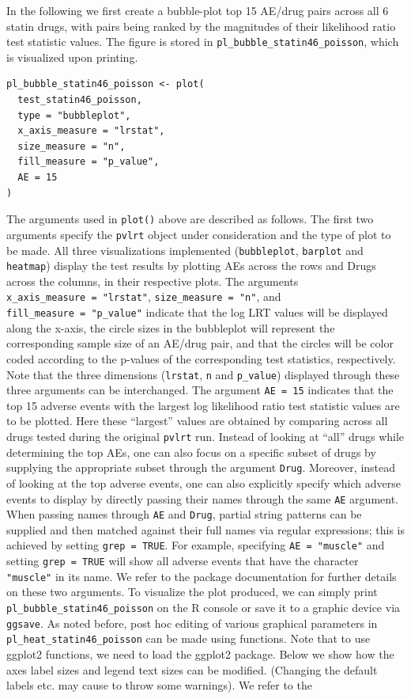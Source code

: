 In the following we first create a bubble-plot top 15 AE/drug pairs across all 6 statin drugs, with pairs being ranked by the magnitudes of their likelihood ratio test statistic values. The figure is stored in \texttt{pl\_bubble\_statin46\_poisson}, which is visualized upon printing.

\begin{verbatim}
pl_bubble_statin46_poisson <- plot(
  test_statin46_poisson,
  type = "bubbleplot",
  x_axis_measure = "lrstat",
  size_measure = "n",
  fill_measure = "p_value",
  AE = 15
)
\end{verbatim}

The arguments used in \texttt{plot()} above are described as follows. The first two arguments specify the \texttt{pvlrt} object under consideration and the type of plot to be made. All three visualizations implemented (\texttt{bubbleplot}, \texttt{barplot} and \texttt{heatmap}) display the test results by plotting AEs across the rows and Drugs across the columns, in their respective plots. The arguments \texttt{x\_axis\_measure\ =\ "lrstat"}, \texttt{size\_measure\ =\ "n"}, and \texttt{fill\_measure\ =\ "p\_value"} indicate that the log LRT values will be displayed along the x-axis, the circle sizes in the bubbleplot will represent the corresponding sample size of an AE/drug pair, and that the circles will be color coded according to the p-values of the corresponding test statistics, respectively. Note that the three dimensions (\texttt{lrstat}, \texttt{n} and \texttt{p\_value}) displayed through these three arguments can be interchanged. The argument \texttt{AE\ =\ 15} indicates that the top 15 adverse events with the largest log likelihood ratio test statistic values are to be plotted. Here these ``largest'' values are obtained by comparing across all drugs tested during the original \texttt{pvlrt} run. Instead of looking at ``all'' drugs while determining the top AEs, one can also focus on a specific subset of drugs by supplying the appropriate subset through the argument \texttt{Drug}. Moreover, instead of looking at the top adverse events, one can also explicitly specify which adverse events to display by directly passing their names through the same \texttt{AE} argument. When passing names through \texttt{AE} and \texttt{Drug}, partial string patterns can be supplied and then matched against their full names via regular expressions; this is achieved by setting \texttt{grep\ =\ TRUE}. For example, specifying \texttt{AE\ =\ "muscle"} and setting \texttt{grep\ =\ TRUE} will show all adverse events that have the character \texttt{"muscle"} in its name. We refer to the package documentation for further details on these two arguments. To visualize the plot produced, we can simply print \texttt{pl\_bubble\_statin46\_poisson} on the R console or save it to a graphic device via \texttt{ggsave}. As noted before, post hoc editing of various graphical parameters in \texttt{pl\_heat\_statin46\_poisson} can be made using  functions. Note that to use ggplot2 functions, we need to load the ggplot2 package. Below we show how the axes label sizes and legend text sizes can be modified. (Changing the default labels etc. may cause  to throw some warnings). We refer to the  